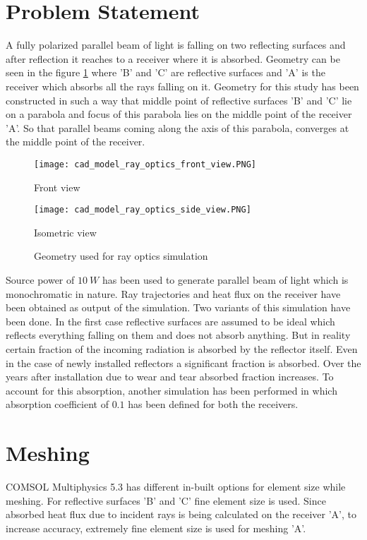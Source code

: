 \section{Problem Statement}\label{sec:ps rayops}
A fully polarized parallel beam of light is falling on two reflecting surfaces and after reflection it reaches to a receiver where it is absorbed. Geometry can be seen in the figure \ref{fig:geo ray ops} where 'B' and 'C' are reflective surfaces and 'A' is the receiver which absorbs all the rays falling on it. Geometry for this study has been constructed in such a way that middle point of reflective surfaces 'B' and 'C' lie on a parabola and focus of this parabola lies on the middle point of the receiver 'A'. So that parallel beams coming along the axis of this parabola, converges at the middle point of the receiver. 
\begin{figure}[H]
  \centering
  \begin{minipage}[b]{0.4\textwidth}
    \texttt{[image: cad\_model\_ray\_optics\_front\_view.PNG]}
    \caption{Front view}
  \end{minipage}
  \hfill
  \begin{minipage}[b]{0.4\textwidth}
    \texttt{[image: cad\_model\_ray\_optics\_side\_view.PNG]}
    \caption{Isometric view}
  \end{minipage}
  \label{fig:geo ray ops}
  \caption{Geometry used for ray optics simulation}
\end{figure}
Source power of $10\ W$ has been used to generate parallel beam of light which is monochromatic in nature. Ray trajectories and heat flux on the receiver have been obtained as output of the simulation. Two variants of this simulation have been done. In the first case reflective surfaces are assumed to be ideal which reflects everything falling on them and does not absorb anything. But in reality certain fraction of the incoming radiation is absorbed by the reflector itself. Even in the case of newly installed reflectors a significant fraction is absorbed. Over the years after installation due to wear and tear absorbed fraction increases. To account for this absorption, another simulation has been performed in which absorption coefficient of $0.1$ has been defined for both the receivers.
\section{Meshing}
COMSOL Multiphysics 5.3 has different in-built options for element size while meshing. For reflective surfaces 'B' and 'C' fine element size is used. Since absorbed heat flux due to incident rays is being calculated on the receiver 'A', to increase accuracy, extremely fine element size is used for meshing 'A'.
